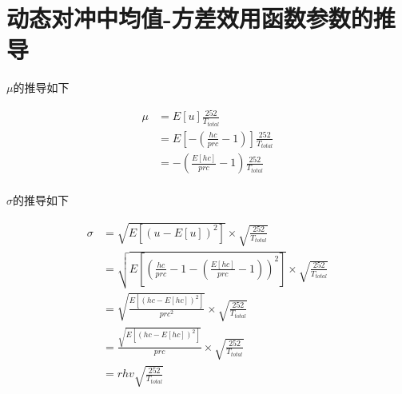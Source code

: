 
\chapter{动态对冲中均值-方差效用函数参数的推导}
\label{app:eq}

$\mu$的推导如下

\begin{equation}
  \begin{aligned}
    \mu&=E[u]\frac{252}{T_{total}}\\
    &=E[-(\frac{hc}{prc}-1)]\frac{252}{T_{total}}\\
    &=-(\frac{E[hc]}{prc}-1)\frac{252}{T_{total}}\\
  \end{aligned}
\end{equation}

$\sigma$的推导如下

\begin{equation}
  \begin{aligned}
    \sigma&=\sqrt{E[(u-E[u])^2]}\times\sqrt{\frac{252}{T_{total}}}\\
    &=\sqrt{E[(\frac{hc}{prc}-1-(\frac{E[hc]}{prc}-1))^2]}\times\sqrt{\frac{252}{T_{total}}}\\
    &=\sqrt{\frac{E[(hc-E[hc])^2]}{prc^2}}\times\sqrt{\frac{252}{T_{total}}}\\
    &=\frac{\sqrt{E[(hc-E[hc])^2]}}{prc}\times\sqrt{\frac{252}{T_{total}}}\\
    &=rhv\sqrt{\frac{252}{T_{total}}}\\
  \end{aligned}
\end{equation}
